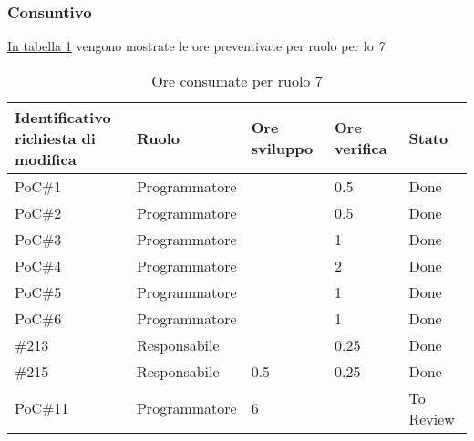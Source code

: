 \subsubsection{Consuntivo}
\hyperref[tab:sprint7_ore_consumate]{In tabella \ref{tab:sprint7_ore_consumate}} vengono mostrate le ore preventivate per ruolo per lo \textit{ 7}.

\begin{table}[H]
    \centering
    \begin{tabular}{| l | l | l | l | l |}
        \hline
            \makecell{\textbf{Identificativo} \\ \textbf{richiesta di modifica}} &
            \textbf{Ruolo} &
            \textbf{Ore sviluppo} &
            \textbf{Ore verifica} &
            \textbf{Stato}\\
        \hline
        PoC\#1 & Programmatore &  & 0.5 & Done\\
        \hline
        PoC\#2 & Programmatore &  & 0.5 & Done\\
        \hline
        PoC\#3 & Programmatore &  & 1 & Done\\
        \hline
        PoC\#4 & Programmatore &  & 2 & Done\\
        \hline
        PoC\#5 & Programmatore &  & 1 & Done\\
        \hline
        PoC\#6 & Programmatore &  & 1 & Done\\
        \hline
        \#213 & Responsabile &  & 0.25 & Done\\
        \hline
        \#215 & Responsabile & 0.5 & 0.25 & Done\\
        \hline
        PoC\#11 & Programmatore & 6 & & To Review\\
        \hline
    \end{tabular}
    \caption{Ore consumate per ruolo  7}
    \label{tab:sprint7_ore_consumate} 
\end{table}